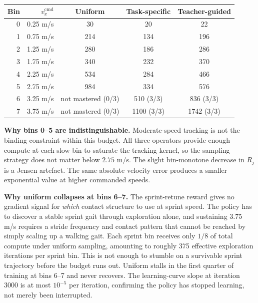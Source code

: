 \documentclass[a4paper,11pt]{article}
\begin{document}
    \begin{center}
    \begin{tabular}{@{}r r c c c@{}}
    \toprule
    \textbf{Bin} & $v_x^{\mathrm{cmd}}$ & \textbf{Uniform} & \textbf{Task-specific} & \textbf{Teacher-guided} \\
    \midrule
    0 & 0.25 m/s & 30   & 20  & 22 \\
    1 & 0.75 m/s & 214  & 134 & 196 \\
    2 & 1.25 m/s & 280  & 186 & 286 \\
    3 & 1.75 m/s & 340  & 232 & 370 \\
    4 & 2.25 m/s & 534  & 284 & 466 \\
    5 & 2.75 m/s & 984  & 334 & 576 \\
    6 & 3.25 m/s & not mastered (0/3) & 510 (3/3)  & 836 (3/3)  \\
    7 & 3.75 m/s & not mastered (0/3) & 1100 (3/3) & 1742 (3/3) \\
    \bottomrule
    \end{tabular}
    \label{tab:phase1_itm}
    \end{center}

    \textbf{Why bins 0--5 are indistinguishable.} Moderate-speed tracking is not the binding constraint within this budget. All three operators provide enough compute at each slow bin to saturate the tracking kernel, so the sampling strategy does not matter below $2.75$ m/s. The slight bin-monotone decrease in $R_j$ is a Jensen artefact. The same absolute velocity error produces a smaller exponential value at higher commanded speeds.

    \textbf{Why uniform collapses at bins 6--7.} The sprint-retune reward gives no gradient signal for \textit{which} contact structure to use at sprint speed. The policy has to discover a stable sprint gait through exploration alone, and sustaining $3.75$ m/s requires a stride frequency and contact pattern that cannot be reached by simply scaling up a walking gait. Each sprint bin receives only $1/8$ of total compute under uniform sampling, amounting to roughly 375 effective exploration iterations per sprint bin. This is not enough to stumble on a survivable sprint trajectory before the budget runs out. Uniform stalls in the first quarter of training at bins 6--7 and never recovers. The learning-curve slope at iteration 3000 is at most $10^{-5}$ per iteration, confirming the policy has stopped learning, not merely been interrupted.
\end{document}
